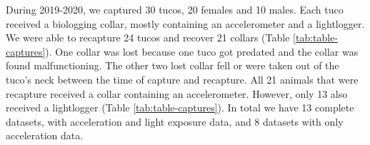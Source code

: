\documentclass[english,msc,numbers,hidelinks]{coppe}
\begin{document}
  During 2019-2020, we captured 30 tucos, 20 females and 10 males. Each tuco received a biologging collar, mostly containing an accelerometer and a lightlogger. We were able to recapture 24 tucos and recover 21 collars (Table \ref{tab:table-captures}). One collar was lost because one tuco got predated and the collar was found malfunctioning. The other two lost collar fell or were taken out of the tuco's neck between the time of capture and recapture. All 21 animals that were recapture received a collar containing an accelerometer. However, only 13 also received a lightlogger (Table \ref{tab:table-captures}). In total we have 13 complete datasets, with acceleration and light exposure data, and 8 datasets with only acceleration data.
  \begin{table}[h]
  \centering
  \caption{Number of captured animals and sensors deployed in the field. There was a higher number of females captured independent of the season. Recapture rates in February 2021 are lower because field work had to be interrupted due to the covid outbreak. Not all recaptured tucos still had their collars. Some collar were taken out by the animals between the time of captured and recaptured. One tuco was predated and the collar was found 1km away from the initial capture burrow malfunctioning.}
  \label{tab:table-captures}
  \end{table}
\end{document}
